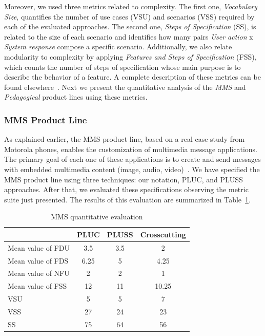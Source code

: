 \documentclass{report}
\begin{document}
\begin{frontmatter}
{Moreover, we used three metrics related to complexity.
The first one, \emph{Vocabulary Size}, quantifies the number of use
cases (VSU) and scenarios (VSS) required by each of the evaluated
approaches. The second one, \emph{Steps of Specification}
(SS), is related to the size of each scenario and identifies
how many pairs \emph{User action} x \emph{System response} compose a
specific scenario. Additionally, we also relate modularity to
complexity by applying \emph{Features and Steps of Specification}
(FSS), which counts the number of steps of specification
whose main purpose is to describe the behavior of a feature. 
A complete description of these metrics can be found elsewhere~\cite{rbonifacio-ea-2008}. Next we 
present the quantitative analysis of the \emph{MMS} and \emph{Pedagogical} product lines using these metrics.

\subsubsection{MMS Product Line}

As explained earlier, the MMS product line, based on a real case study from Motorola phones, enables the customization of 
multimedia message applications. The primary goal of each one of these applications is to create and 
send messages with embedded multimedia content (image, audio, video)~\cite{rbonifacio-ea-2008}. 
We have specified the MMS product line using three techniques: our notation, PLUC, and PLUSS approaches. After that, we evaluated these specifications observing the metric suite just presented. The results of this evaluation are summarized in Table~\ref{tab:metrics}. 

\begin{table}[htb]
\centering
\nocaptionrule \caption{MMS quantitative evaluation}
\label{tab:metrics}
\begin{small}
\begin{tabular}{lccc} \hline
					& PLUC 	& PLUSS 	& Crosscutting	\\ \hline
Mean value of FDU 		& 3.5	& 3.5	& 2		\\
Mean value of FDS 		& 6.25	& 5		& 4.25	\\
Mean value of NFU 		& 2		& 2		& 1		\\
Mean value of FSS 		&12		& 11		& 10.25	\\ 
VSU 					& 5		& 5		& 7		\\
VSS 					& 27		& 24		& 23		\\
SS 					& 75		& 64		& 56		\\	\hline
\end{tabular}
\end{small}
\end{table}

}
\end{frontmatter}
\end{document}
